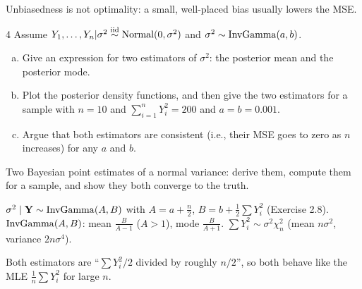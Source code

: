 \documentclass[11pt]{article}
\begin{document}
\begin{takeaway}
Unbiasedness is not optimality: a small, well-placed bias usually lowers the MSE.
\end{takeaway}


\begin{problem}{4}
Assume $Y_1,\dots,Y_n|\sigma^2\stackrel{\text{iid}}{\sim}\mathrm{Normal}(0,\sigma^2)$ and $\sigma^2\sim\mathrm{InvGamma}(a,b)$.
\begin{enumerate}[(a)]
\item Give an expression for two estimators of $\sigma^2$: the posterior mean and the posterior mode.
\item Plot the posterior density functions, and then give the two estimators for a sample with $n=10$ and $\sum_{i=1}^nY_i^2=200$ and $a=b=0.001$.
\item Argue that both estimators are consistent (i.e., their MSE goes to zero as $n$ increases) for any $a$ and $b$.
\end{enumerate}
\end{problem}

\begin{restate}
Two Bayesian point estimates of a normal variance: derive them, compute them for a sample, and show they both converge to the truth.
\end{restate}

\begin{recall}
$\sigma^2\mid\mathbf Y\sim\mathrm{InvGamma}(A,B)$ with $A=a+\frac n2$, $B=b+\frac12\sum Y_i^2$ (Exercise 2.8). $\mathrm{InvGamma}(A,B)$: mean $\frac{B}{A-1}$ ($A>1$), mode $\frac{B}{A+1}$. $\sum Y_i^2\sim\sigma^2\chi^2_n$ (mean $n\sigma^2$, variance $2n\sigma^4$).
\end{recall}

\begin{keyidea}
Both estimators are ``$\sum Y_i^2/2$ divided by roughly $n/2$'', so both behave like the MLE $\frac1n\sum Y_i^2$ for large $n$.
\end{keyidea}
\end{document}
